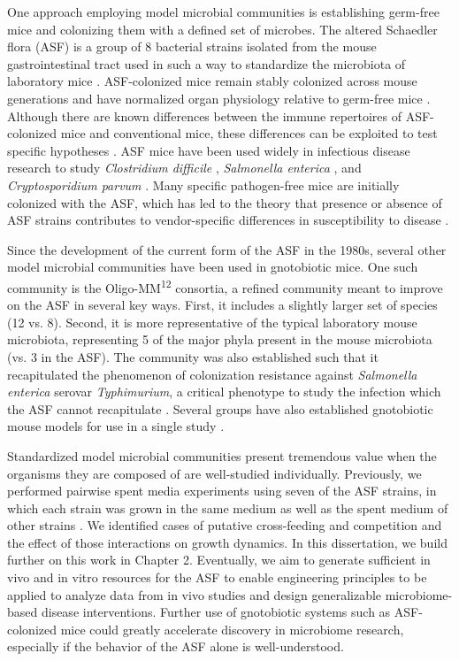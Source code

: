 \documentclass[11pt,twocolumn,notitlepage,openany,twoside]{book}
\begin{document}
\begin{refsection}
One approach employing model microbial communities is establishing germ-free mice and colonizing them with a defined set of microbes. The altered Schaedler flora (ASF) is a group of 8 bacterial strains isolated from the mouse gastrointestinal tract used in such a way to standardize the microbiota of laboratory mice \cite{Wymore_Brand2015-ez}. ASF-colonized mice remain stably colonized across mouse generations and have normalized organ physiology relative to germ-free mice \cite{Wymore_Brand2015-ez}. Although there are known differences between the immune repertoires of ASF-colonized mice and conventional mice, these differences can be exploited to test specific hypotheses \cite{Geuking2011-fj,Ivanov2009-vl}. ASF mice have been used widely in infectious disease research to study \textit{Clostridium difficile} \cite{Schwan2009-zo}, \textit{Salmonella enterica} \cite{Brugiroux2016-vi}, and \textit{Cryptosporidium parvum} \cite{Harp1992-wr}. Many specific pathogen-free mice are initially colonized with the ASF, which has led to the theory that presence or absence of ASF strains contributes to vendor-specific differences in susceptibility to disease \cite{Singer2000-tr}.

Since the development of the current form of the ASF in the 1980s, several other model microbial communities have been used in gnotobiotic mice. One such community is the Oligo-MM\textsuperscript{12} consortia, a refined community meant to improve on the ASF in several key ways\cite{Brugiroux2016-vi}. First, it includes a slightly larger set of species (12 vs. 8). Second, it is more representative of the typical laboratory mouse microbiota, representing 5 of the major phyla present in the mouse microbiota (vs. 3 in the ASF). The community was also established such that it recapitulated the phenomenon of colonization resistance against \textit{Salmonella enterica} serovar \textit{Typhimurium}, a critical phenotype to study the infection which the ASF cannot recapitulate \cite{Brugiroux2016-vi}. Several groups have also established gnotobiotic mouse models for use in a single study \cite{Faith2014-de}.

Standardized model microbial communities present tremendous value when the organisms they are composed of are well-studied individually. Previously, we performed pairwise spent media experiments using seven of the ASF strains, in which each strain was grown in the same medium as well as the spent medium of other strains \cite{Biggs2017-fs}. We identified cases of putative cross-feeding and competition and the effect of those interactions on growth dynamics. In this dissertation, we build further on this work in Chapter 2. Eventually, we aim to generate sufficient in vivo and in vitro resources for the ASF to enable engineering principles to be applied to analyze data from in vivo studies and design generalizable microbiome-based disease interventions. Further use of gnotobiotic systems such as ASF-colonized mice could greatly accelerate discovery in microbiome research, especially if the behavior of the ASF alone is well-understood.


\end{refsection}
\end{document}
